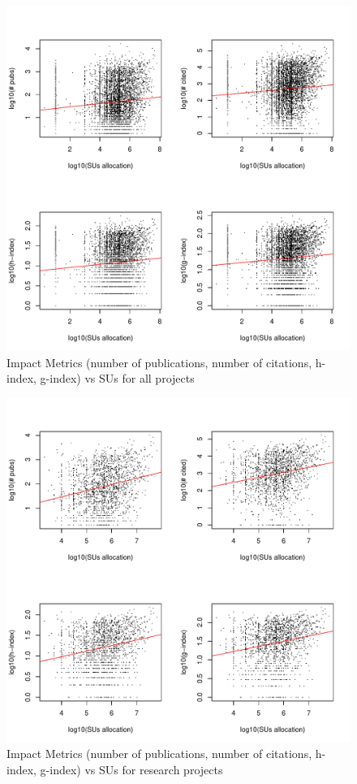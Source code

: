 \documentclass{tex/sig-alternate}
\begin{document}
\begin{figure}[!htb] 
  \centering 
    \includegraphics[width=1.0\columnwidth]{images/02_metrics_vs_alloc_proj.pdf} 
  \caption{Impact Metrics (number of publications, number of citations, h-index, g-index) vs SUs for all projects}\label{F:metrics-vs-alloc-proj} 
\end{figure} 
 
\begin{figure}[!htb] 
  \centering 
    \includegraphics[width=1.0\columnwidth]{images/02_metrics_vs_alloc_research_proj.pdf} 
  \caption{Impact Metrics (number of publications, number of citations, h-index, g-index) vs SUs for research projects}\label{F:metrics-vs-alloc-research-proj} 
\end{figure} 
 
\end{document}
